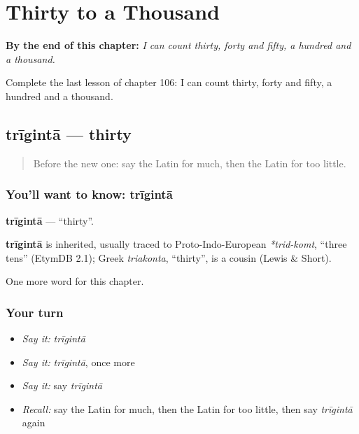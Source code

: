 
\chapter{Thirty to a Thousand}
\label{ch:la-thirty-to-a-thousand}

\begin{chapteropening}
\textbf{By the end of this chapter:} \emph{I can count thirty, forty and fifty, a hundred and a thousand.}

Complete the last lesson of chapter 106: I can count thirty, forty and fifty, a hundred and a thousand.
\end{chapteropening}

\section[trīgintā]{trīgintā — thirty}

\label{lesson:LA-C106-triginta}



\begin{quote}
Before the new one: say the Latin for much, then the Latin for too little.
\end{quote}

\subsection*{You'll want to know: trīgintā}
\textbf{trīgintā} — \textquotedblleft{}thirty\textquotedblright{}.

\begin{cousinweb}
\textbf{trīgintā} is inherited, usually traced to Proto-Indo-European \emph{*trid-komt}, \textquotedblleft{}three tens\textquotedblright{} (EtymDB 2.1); Greek \emph{triakonta}, \textquotedblleft{}thirty\textquotedblright{}, is a cousin (Lewis \& Short).
\end{cousinweb}

\begin{grammarlens}[title={What you've built}]
One more word for this chapter.
\end{grammarlens}

\subsection*{Your turn}
\begin{itemize}
\raggedright
  \item \emph{Say it:} \emph{trīgintā}
  \item \emph{Say it:} \emph{trīgintā}, once more
  \item \emph{Say it:} say \emph{trīgintā}
  \item \emph{Recall:} say the Latin for much, then the Latin for too little, then say \emph{trīgintā} again
\end{itemize}

